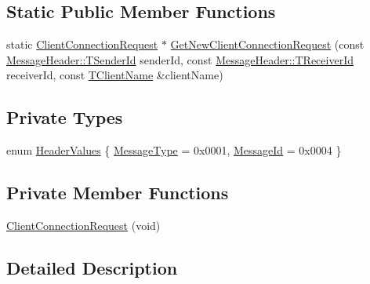 \subsection*{Static Public Member Functions}
\begin{DoxyCompactItemize}
\item 
static \hyperlink{class_terra_swarm_1_1_synchronous_1_1_client_connection_request}{Client\-Connection\-Request} $\ast$ \hyperlink{class_terra_swarm_1_1_synchronous_1_1_client_connection_request_a73614eb55926c474741df4d752a34331}{Get\-New\-Client\-Connection\-Request} (const \hyperlink{class_terra_swarm_1_1_message_header_a516b36855e2aad7cfbf8770f1b42784f}{Message\-Header\-::\-T\-Sender\-Id} sender\-Id, const \hyperlink{class_terra_swarm_1_1_message_header_aa3260702b182b6f88ddbdd3416e98df0}{Message\-Header\-::\-T\-Receiver\-Id} receiver\-Id, const \hyperlink{class_terra_swarm_1_1_synchronous_1_1_client_connection_request_a7d85ca6773adf2b3b32cfbff9706f882}{T\-Client\-Name} \&client\-Name)
\end{DoxyCompactItemize}
\subsection*{Private Types}
\begin{DoxyCompactItemize}
\item 
enum \hyperlink{class_terra_swarm_1_1_synchronous_1_1_client_connection_request_aea4a8b2edd6730c9b592394868d059e3}{Header\-Values} \{ \hyperlink{class_terra_swarm_1_1_synchronous_1_1_client_connection_request_aea4a8b2edd6730c9b592394868d059e3abd99d038acc6de976f899ab9fc50595d}{Message\-Type} = 0x0001, 
\hyperlink{class_terra_swarm_1_1_synchronous_1_1_client_connection_request_aea4a8b2edd6730c9b592394868d059e3a53c5286b4426b73ea18df2b4e03948ff}{Message\-Id} = 0x0004
 \}
\end{DoxyCompactItemize}
\subsection*{Private Member Functions}
\begin{DoxyCompactItemize}
\item 
\hyperlink{class_terra_swarm_1_1_synchronous_1_1_client_connection_request_a807ffa63107a4e1147eebde79ed61f68}{Client\-Connection\-Request} (void)
\end{DoxyCompactItemize}


\subsection{Detailed Description}


